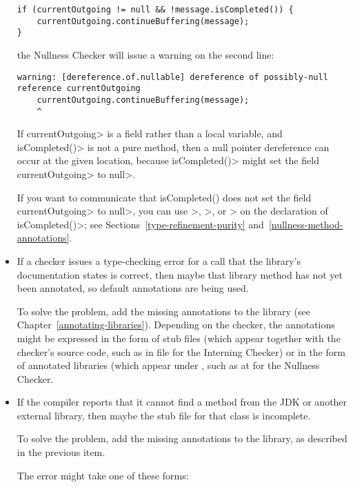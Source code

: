 \begin{itemize}
\begin{Verbatim}
if (currentOutgoing != null && !message.isCompleted()) {
    currentOutgoing.continueBuffering(message);
}
\end{Verbatim}

\noindent
the Nullness Checker will issue a warning on the second line:
\begin{Verbatim}
warning: [dereference.of.nullable] dereference of possibly-null reference currentOutgoing
    currentOutgoing.continueBuffering(message);
    ^
\end{Verbatim}

If \<currentOutgoing> is a field rather than a local variable, and
\<isCompleted()> is not a pure method, then a null pointer
dereference can occur at the given location, because \<isCompleted()> might set
the field \<currentOutgoing> to \<null>.

If you want to communicate that
isCompleted() does not set the field \<currentOutgoing> to \<null>, you can use
\<>,
\<>,
or \<> on the
declaration of \<isCompleted()>; see Sections~\ref{type-refinement-purity}
and~\ref{nullness-method-annotations}.


\item
If a checker issues a type-checking error for a call that the library's
documentation states is correct, then maybe that library method has not yet
been annotated, so default annotations are being used.

To solve the problem, add the missing annotations to the library (see
Chapter~\ref{annotating-libraries}).  Depending on the checker, the
annotations might be expressed in the form of stub files (which appear
together with the checker's source code, such as in file
 for the
Interning Checker) or in the form of annotated libraries (which appear
under , such as at  for
the Nullness Checker.

\item
If the compiler reports that it cannot find a method from the JDK or
another external library, then maybe the stub file for that class
is incomplete.

To solve the problem, add the missing annotations to the library, as
described in the previous item.

The error might take one of these forms:


\end{itemize}
